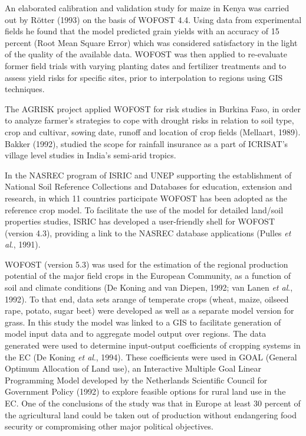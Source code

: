 An elaborated calibration and validation study for maize in Kenya was carried out by
R\"{o}tter (1993) on the basis of WOFOST 4.4. Using data from experimental fields he
found that the model predicted grain yields with an accuracy of 15 percent (Root Mean
Square Error) which was considered satisfactory in the light of the quality of the available
data. WOFOST was then applied to re-evaluate former field trials with varying planting
dates and fertilizer treatments and to assess yield risks for specific sites, prior to
interpolation to regions using GIS techniques.

The AGRISK project applied WOFOST for risk studies in Burkina Faso, in order to
analyze farmer's strategies to cope with drought risks in relation to soil type, crop and
cultivar, sowing date, runoff and location of crop fields (Mellaart, 1989). Bakker (1992),
studied the scope for rainfall insurance as a part of ICRISAT's village level studies in
India's semi-arid tropics.

In the NASREC program of ISRIC and UNEP supporting the estab\-lishment of National
Soil Reference Collections and Databases for education, extension and research, in which
11 countries participate WOFOST has been adopted as the reference crop model. To
facilitate the use of the model for detailed land/soil properties studies, ISRIC has
developed a user-friendly shell for WOFOST (version 4.3), providing a link to the
NASREC database applications (Pulles {\it et al}., 1991).

WOFOST (version 5.3) was used for the estimation of the regional production potential of
the major field crops in the European Community, as a function of soil and climate 
condi\-tions (De Koning and van Diepen, 1992; van Lanen {\it et al}., 1992). To that end, 
data sets arange of temperate crops (wheat, maize, oilseed rape, potato, sugar beet) were 
devel\-oped as well as a separate model version for grass. In this study the model was linked
to a GIS to facilitate generation of model input data and to aggregate model output over regions.
The data generated were used to determine input-output coefficients of cropping systems
in the EC (De Koning {\it et al}., 1994). These coefficients were used in GOAL (General
Optimum Allocation of Land use), an Interactive Multiple Goal Linear Program\-ming
Model developed by the Netherlands Scien\-tific Council for Government Policy (1992) to
explore feasible options for rural land use in the EC. One of the conclusions of the study
was that in Europe at least 30 percent of the agricultural land could be taken out of
production without endangering food security or compromising other major politi\-cal
objectives.

